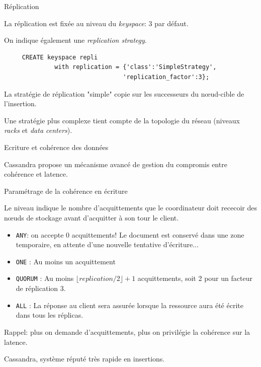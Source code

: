 \begin{frame}[fragile]{Réplication}

La réplication est fixée au niveau du \textit{keyspace}: 3 par défaut.
	
\vfill

On indique également une \textit{replication strategy}.

\begin{verbatim}
     CREATE keyspace repli 
              with replication = {'class':'SimpleStrategy', 
                                 'replication_factor':3};
\end{verbatim}

\vfill

La stratégie de réplication "simple" copie sur les successeurs du nœud-cible de l'insertion.

\vfill

Une stratégie plus complexe tient compte de la topologie du réseau (niveaux \textit{racks}
et \textit{data centers}). 

\end{frame}


\begin{frame}[fragile]{Ecriture et cohérence des données}

Cassandra propose un mécanisme avancé de gestion du compromis entre cohérence et latence. 


\vfill




\end{frame}

\begin{frame}[fragile]{Paramétrage de la cohérence en écriture}

Le niveau indique le nombre d'acquittements que le coordinateur doit rececoir des nœuds de stockage avant d'acquitter
à son tour le client.

\begin{itemize}
   \item \texttt{ANY}:  on accepte 0 acquittements! Le document est conservé  dans une zone temporaire, en attente d'une nouvelle tentative d'écriture...

    \item \texttt{ONE} : Au moins un acquittement

    \item \texttt{QUORUM} : Au moins $\lfloor replication/2 \rfloor +1$ acquittements, soit 2 pour un facteur de réplication 3.
    
    \item \texttt{ALL} : La réponse au client sera assurée lorsque la ressource aura été écrite dans tous les réplicas. 
\end{itemize}

\vfill

Rappel: plus on demande d'acquittements, plus on privilégie la cohérence sur la latence.

\vfill

Cassandra, système réputé très rapide en insertions.

\end{frame}

